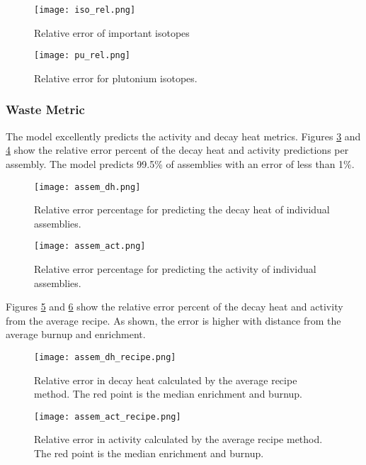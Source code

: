 \begin{figure}
    \centering
    \texttt{[image: iso\_rel.png]}
    \caption{Relative error of important isotopes}
    \label{fig:iso_rel}
\end{figure}


\begin{figure}
    \centering
    \texttt{[image: pu\_rel.png]}
    \caption{Relative error for plutonium isotopes.}
    \label{fig:pu_rel}
\end{figure}

\FloatBarrier


\subsubsection{Waste Metric}
The model excellently predicts the activity
and decay heat metrics. Figures \ref{fig:assem_dh} and \ref{fig:assem_act}
show the relative error percent of the decay heat and activity
predictions per assembly. The model predicts 99.5\% of
assemblies with an error of less than 1\%.


\begin{figure}
    \centering
    \texttt{[image: assem\_dh.png]}
    \caption{Relative error percentage for predicting the decay
             heat of individual assemblies.}
    \label{fig:assem_dh}
\end{figure}


\begin{figure}
    \centering
    \texttt{[image: assem\_act.png]}
    \caption{Relative error percentage for predicting the
             activity of individual assemblies.}
    \label{fig:assem_act}
\end{figure}


Figures \ref{fig:assem_dh_recipe} and
\ref{fig:assem_act_recipe} show the relative error percent
of the decay heat and activity from the average recipe.
As shown, the error is higher with distance from the
average burnup and enrichment.


\begin{figure}
    \centering
    \texttt{[image: assem\_dh\_recipe.png]}
    \caption{Relative error in decay heat calculated by the average recipe
             method. The red point is the median enrichment and
             burnup.}
    \label{fig:assem_dh_recipe}
\end{figure}

\begin{figure}
    \centering
    \texttt{[image: assem\_act\_recipe.png]}
    \caption{Relative error in activity
             calculated by the average recipe method.
             The red point is the median enrichment and
             burnup.}
    \label{fig:assem_act_recipe}
\end{figure}

